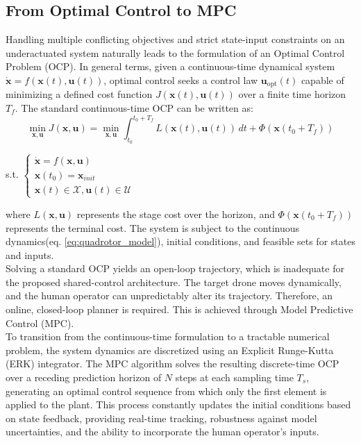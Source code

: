 \subsection{From Optimal Control to MPC}
Handling multiple conflicting objectives and strict state-input constraints on an underactuated system naturally leads to the formulation of an Optimal Control Problem (OCP). In general terms, given a continuous-time dynamical system $\dot{\mathbf{x}} = f(\mathbf{x}(t), \mathbf{u}(t))$, optimal control seeks a control law $\mathbf{u}_{\text{opt}}(t)$ capable of minimizing a defined cost function $J(\mathbf{x}(t), \mathbf{u}(t))$ over a finite time horizon $T_f$. The standard continuous-time OCP can be written as:
\begin{equation}
\min_{\mathbf{x},\mathbf{u}} J(\mathbf{x}, \mathbf{u}) = \min_{\mathbf{x}, \mathbf{u}} \int_{t_0}^{t_0+T_f} L(\mathbf{x}(t), \mathbf{u}(t)) \, dt + \Phi(\mathbf{x}(t_0+T_f))
\end{equation}
\begin{center}
s.t.
$\begin{cases}
    \dot{\mathbf{x}} = f(\mathbf{x} , \mathbf{u})\\
    \mathbf{x}(t_0) = \mathbf{x}_{init}\\
    \mathbf{x}(t) \in \mathcal{X}, \mathbf{u}(t) \in \mathcal{U}
\end{cases}$
\end{center}
where $L(\mathbf{x,u})$ represents the stage cost over the horizon, and $\Phi(\mathbf{x}(t_0+T_f))$ represents the terminal cost. The system is subject to the continuous dynamics(eq. \ref{eq:quadrotor_model}), initial conditions, and feasible sets for states and inputs.
\\Solving a standard OCP yields an open-loop trajectory, which is inadequate for the proposed shared-control architecture. The target drone moves dynamically, and the human operator can unpredictably alter its trajectory. Therefore, an online, closed-loop planner is required. This is achieved through Model Predictive Control (MPC).
\\To transition from the continuous-time formulation to a tractable numerical problem, the system dynamics are discretized using an Explicit Runge-Kutta (ERK) integrator. The MPC algorithm solves the resulting discrete-time OCP over a receding prediction horizon of $N$ steps at each sampling time $T_s$, generating an optimal control sequence from which only the first element is applied to the plant. This process constantly updates the initial conditions based on state feedback, providing real-time tracking, robustness against model uncertainties, and the ability to incorporate the human operator's inputs.

